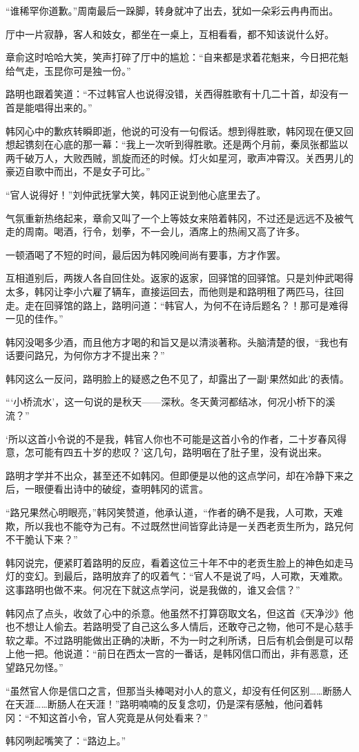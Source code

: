 “谁稀罕你道歉。”周南最后一跺脚，转身就冲了出去，犹如一朵彩云冉冉而出。

厅中一片寂静，客人和妓女，都坐在一桌上，互相看看，都不知该说什么好。

章俞这时哈哈大笑，笑声打碎了厅中的尴尬：“自来都是求着花魁来，今日把花魁给气走，玉昆你可是独一份。”

路明也跟着笑道：“不过韩官人也说得没错，关西得胜歌有十几二十首，却没有一首是能唱得出来的。”

韩冈心中的歉疚转瞬即逝，他说的可没有一句假话。想到得胜歌，韩冈现在便又回想起镌刻在心底的那一幕：“我上一次听到得胜歌。还是两个月前，秦凤张都监以两千破万人，大败西贼，凯旋而还的时候。灯火如星河，歌声冲霄汉。关西男儿的豪迈自歌中而出，不是女子可比。”

“官人说得好！”刘仲武抚掌大笑，韩冈正说到他心底里去了。

气氛重新热络起来，章俞又叫了一个上等妓女来陪着韩冈，不过还是远远不及被气走的周南。喝酒，行令，划拳，不一会儿，酒席上的热闹又高了许多。

一顿酒喝了不短的时间，最后因为韩冈晚间尚有要事，方才作罢。

互相道别后，两拨人各自回住处。返家的返家，回驿馆的回驿馆。只是刘仲武喝得太多，韩冈让李小六雇了辆车，直接运回去，而他则是和路明租了两匹马，往回走。走在回驿馆的路上，路明问道：“韩官人，为何不在诗后题名？！那可是难得一见的佳作。”

韩冈没喝多少酒，而且他方才喝的和旨又是以清淡著称。头脑清楚的很，“我也有话要问路兄，为何你方才不提出来？”

韩冈这么一反问，路明脸上的疑惑之色不见了，却露出了一副‘果然如此’的表情。

“‘小桥流水’，这一句说的是秋天——深秋。冬天黄河都结冰，何况小桥下的溪流？”

‘所以这首小令说的不是我，韩官人你也不可能是这首小令的作者，二十岁春风得意，怎可能有四五十岁的悲叹？’这几句，路明咽在了肚子里，没有说出来。

路明才学并不出众，甚至还不如韩冈。但即便是以他的这点学问，却在冷静下来之后，一眼便看出诗中的破绽，查明韩冈的谎言。

“路兄果然心明眼亮，”韩冈笑赞道，他承认道，“作者的确不是我，人可欺，天难欺，所以我也不能夺为己有。不过既然世间皆穿此诗是一关西老贡生所为，路兄何不干脆认下来？”

韩冈说完，便紧盯着路明的反应，看着这位三十年不中的老贡生脸上的神色如走马灯的变幻。到最后，路明放弃了的叹着气：“官人不是说了吗，人可欺，天难欺。这事路明也做不来。何况在下就这点学问，说是我做的，谁又会信？”

韩冈点了点头，收敛了心中的杀意。他虽然不打算窃取文名，但这首《天净沙》他也不想让人偷去。若路明受了自己这么多人情后，还敢夺己之物，他可不是心慈手软之辈。不过路明能做出正确的决断，不为一时之利所诱，日后有机会倒是可以帮上他一把。他说道：“前日在西太一宫的一番话，是韩冈信口而出，非有恶意，还望路兄勿怪。”

“虽然官人你是信口之言，但那当头棒喝对小人的意义，却没有任何区别……断肠人在天涯……断肠人在天涯！”路明喃喃的反复念叨，仍是深有感触，他问着韩冈：“不知这首小令，官人究竟是从何处看来？”

韩冈咧起嘴笑了：“路边上。”

